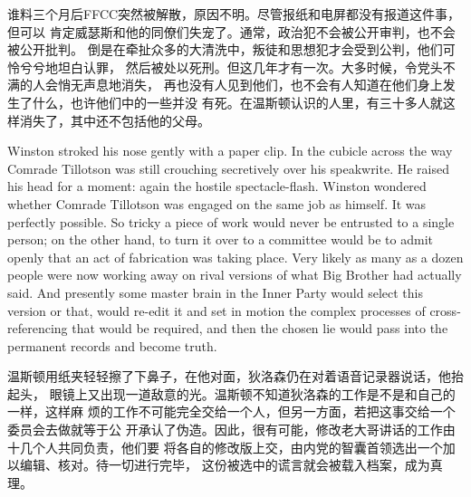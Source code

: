 \begin{paracol}{2}
\switchcolumn

谁料三个月后FFCC突然被解散，原因不明。尽管报纸和电屏都没有报道这件事，但可以
肯定威瑟斯和他的同僚们失宠了。通常，政治犯不会被公开审判，也不会被公开批判。
倒是在牵扯众多的大清洗中，叛徒和思想犯才会受到公判，他们可怜兮兮地坦白认罪，
然后被处以死刑。但这几年才有一次。大多时候，令党头不满的人会悄无声息地消失，
再也没有人见到他们，也不会有人知道在他们身上发生了什么，也许他们中的一些并没
有死。在温斯顿认识的人里，有三十多人就这样消失了，其中还不包括他的父母。

\switchcolumn*

Winston stroked his nose gently with a paper clip. In the cubicle across
the way Comrade Tillotson was still crouching secretively over his
speakwrite. He raised his head for a moment: again the hostile
spectacle-flash. Winston wondered whether Comrade Tillotson was engaged
on the same job as himself. It was perfectly possible. So tricky a piece
of work would never be entrusted to a single person; on the other hand,
to turn it over to a committee would be to admit openly that an act of
fabrication was taking place. Very likely as many as a dozen people were
now working away on rival versions of what Big Brother had actually
said. And presently some master brain in the Inner Party would select
this version or that, would re-edit it and set in motion the complex
processes of cross-referencing that would be required, and then the
chosen lie would pass into the permanent records and become truth.

\switchcolumn

温斯顿用纸夹轻轻擦了下鼻子，在他对面，狄洛森仍在对着语音记录器说话，他抬起头，
眼镜上又出现一道敌意的光。温斯顿不知道狄洛森的工作是不是和自己的一样，这样麻
烦的工作不可能完全交给一个人，但另一方面，若把这事交给一个委员会去做就等于公
开承认了伪造。因此，很有可能，修改老大哥讲话的工作由十几个人共同负责，他们要
将各自的修改版上交，由内党的智囊首领选出一个加以编辑、核对。待一切进行完毕，
这份被选中的谎言就会被载入档案，成为真理。

\switchcolumn*


\end{paracol}
